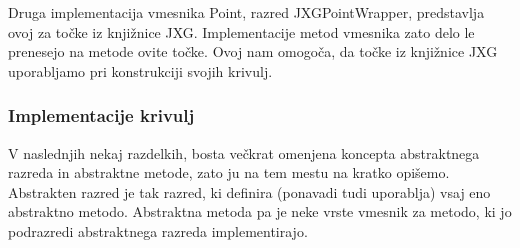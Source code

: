 \documentclass[isrm2, tisk]{fmfdelo}
\begin{document}
    Druga implementacija vmesnika Point, razred JXGPointWrapper, predstavlja ovoj za točke iz knjižnice JXG.
    Implementacije metod vmesnika zato delo le prenesejo na metode ovite točke.
    Ovoj nam omogoča, da točke iz knjižnice JXG uporabljamo pri konstrukciji svojih krivulj.

    \subsubsection{Implementacije krivulj}
    V naslednjih nekaj razdelkih, bosta večkrat omenjena koncepta abstraktnega razreda in abstraktne metode, zato ju na tem mestu na kratko opišemo.
    Abstrakten razred je tak razred, ki definira (ponavadi tudi uporablja) vsaj eno abstraktno metodo.
    Abstraktna metoda pa je neke vrste vmesnik za metodo, ki jo podrazredi abstraktnega razreda implementirajo.
\end{document}
